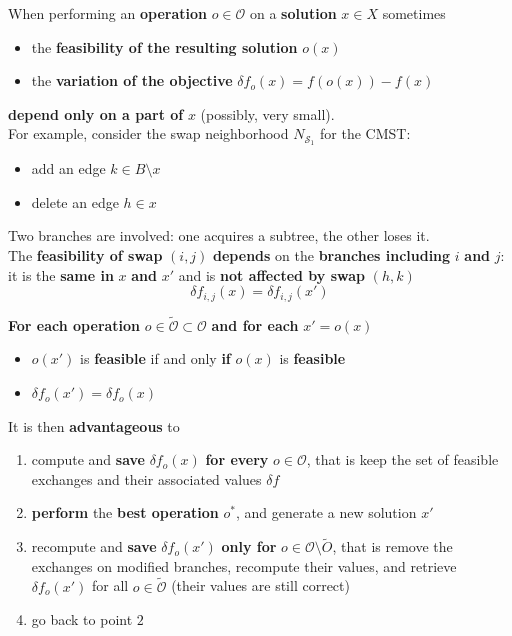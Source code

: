 When performing an \textbf{operation} $o \in \mathcal{O}$ on a \textbf{solution} $x \in X$ sometimes
\begin{itemize}
	\item the \textbf{feasibility of the resulting solution} $o (x)$
	\item the \textbf{variation of the objective} $\delta f_o (x) = f (o(x)) − f (x)$
\end{itemize}
\textbf{depend only on a part of} $x$ (possibly, very small).\\

For example, consider the swap neighborhood $N_{\mathcal{S}_1}$ for the CMST:
\begin{itemize}
	\item add an edge $k \in B \setminus x$
	\item delete an edge $h \in x$
\end{itemize}
Two branches are involved: one acquires a subtree, the other loses it.\\

The \textbf{feasibility of swap} $(i, j)$ \textbf{depends} on the \textbf{branches including} $i$ \textbf{and} $j$: it is the \textbf{same in} $x$ \textbf{and} $x'$ and is \textbf{not affected by swap} $(h, k)$
$$ \delta f_{i,j} (x) = \delta f_{i,j} (x') $$

\textbf{For each operation} $o ∈ \tilde{\mathcal{O}} \subset \mathcal{O}$ \textbf{and for each} $x' = o (x)$
\begin{itemize}
	\item $o (x')$ is \textbf{feasible} if and only \textbf{if} $o (x)$ is \textbf{feasible}
	\item $\delta f_o (x') = \delta f_o (x)$
\end{itemize}

It is then \textbf{advantageous} to
\begin{enumerate}
	\item compute and \textbf{save} $\delta f_o (x)$ \textbf{for every} $o \in \mathcal{O}$, that is keep the set of feasible exchanges and their associated values $\delta f$
	
	\item \textbf{perform} the \textbf{best operation} $o^\ast$, and generate a new solution $x'$
	
	\item recompute and \textbf{save} $\delta f_o (x')$ \textbf{only for} $o ∈ \mathcal{O} \setminus \tilde{O}$, that is remove the exchanges on modified branches, recompute their values, and retrieve $\delta f_o (x')$ for all $o \in \tilde{\mathcal{O}}$ (their values are still correct)
	
	\item go back to point $2$
\end{enumerate}

